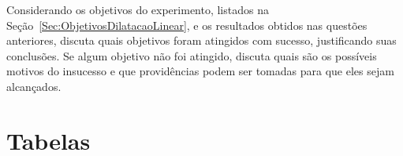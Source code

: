 \begin{question}[type={exam}]{2}
Considerando os objetivos do experimento, listados na Seção~\ref{Sec:ObjetivosDilatacaoLinear}, e os resultados obtidos nas questões anteriores, discuta quais objetivos foram atingidos com sucesso, justificando suas conclusões. Se algum objetivo não foi atingido, discuta quais são os possíveis motivos do insucesso e que providências podem ser tomadas para que eles sejam alcançados.
\end{question}

\vfill
\pagebreak
\section{Tabelas}
